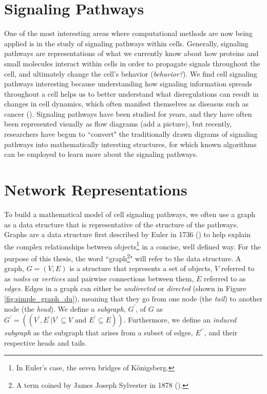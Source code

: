 \documentclass[12pt,twoside]{reedthesis}
\theoremstyle{definition}
\begin{document}
{ \section{Signaling Pathways}

 One of the most interesting areas where computational methods are now being applied is in the study of signaling pathways within cells. Generally, signaling pathways are representations of what we currently know about how proteins and small molecules interact within cells in order to propagate signals throughout the cell, and ultimately change the cell's behavior (\emph{behavior?}). We find cell signaling pathways interesting because understanding how signaling information spreads throughout a cell helps us to better understand what disregulations can result in changes in cell dynamics, which often manifest themselves as diseasus such as cancer (\cite{cancer}). Signaling pathways have been studied for years, and they have often been represented visually as flow diagrams (add a picture), but recently, researchers have begun to ``convert" the traditionally drawn digrams of signaling pathways into mathematically intersting structures, for which known algorithms can be employed to learn more about the signaling pathways.


 \section{Network Representations}

  To build a mathematical model of cell signaling pathways, we often use a graph as a data structure that is representative of the structure of the pathways. Graphs are a data structure first described by Euler in 1736 (\cite{Shields2012}) to help explain the complex relationships between objects\footnote{In Euler's case, the seven bridges of K\"{o}nigsberg.} in a concise, well defined way. For the purpose of this thesis, the word ``graph\footnote{A term coined by James Joseph Sylvester in 1878 (\cite{Biggs1986}).}" will refer to the data structure. A graph, $G=(V,E)$ is a structure that represents a set of objects, $V$ referred to as \textit{nodes} or \textit{vertices} and pairwise connections between them, $E$ referred to as \textit{edges}. Edges in a graph can either be \textit{undirected} or \textit{directed} (shown in Figure \ref{fig:simple_graph_du}), meaning that they go from one node (the \textit{tail}) to another node (the \textit{head}). We define a \textit{subgraph}, $G^\prime$, of $G$ as $G^\prime=((V^\prime,E^\prime | V^\prime \subseteq V \text{ and } E^\prime \subseteq E))$. Furthermore, we define an \textit{induced subgraph} as the subgraph that arises from a subset of edges, $E^{\prime\prime}$, and their respective heads and tails.\par

}
\end{document}
